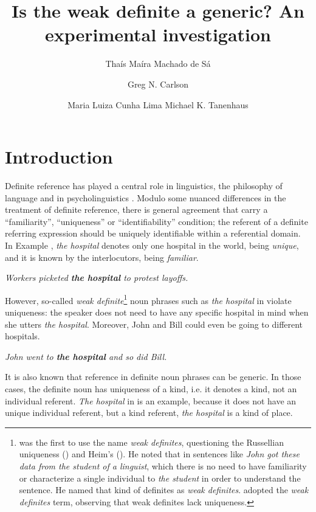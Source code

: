 \documentclass[output=paper,
modfonts
]{langscibook}
\title{Is the weak definite a generic? An experimental investigation}
\author{%
 Thaís Maíra Machado {de Sá}\affiliation{Universidade Federal de Minas Gerais}\and 
 Greg N. Carlson\affiliation{University of Rochester}\and 
 Maria Luiza {Cunha Lima}\affiliation{Universidade Federal de Minas Gerais}
 \lastand 
 Michael K. Tanenhaus\affiliation{University of Rochester \\ Nanjing Normal University}
}
\begin{document}
\maketitle

\section{Introduction}\label{sec:desaetal:1}
Definite reference has played a central role in linguistics, the philosophy of language and in psycholinguistics \citep{Russell1905, Strawson1950,Donnellan1966,ClarkMarshall1981,Heim1982,Aguilar-GuevaraZwarts2013}. Modulo some nuanced differences in the treatment of definite reference, there is general agreement that  carry a “familiarity”, “uniqueness” or “identifiability” condition; the referent of a definite referring expression should be uniquely identifiable within a referential domain. In Example , \textit{the hospital} denotes only one hospital in the world, being \textit{unique}, and it is known by the interlocutors, being \textit{familiar}.

\ea \label{ex:desaetal:1} 
\textit{Workers picketed \textbf{the hospital} to protest layoffs.}
\z

However, so-called \textit{weak definite}\footnote{\citet{Poesio1994} was the first to use the name \textit{weak definites}, questioning the Russellian uniqueness (\citeyear{Russell1905}) and Heim’s  (\citeyear{Heim1982}). He noted that in sentences like \textit{John got these data from the student of a linguist}, which there is no need to have familiarity or characterize a single individual to \textit{the student} in order  to understand the sentence. He named that kind of definites as \textit{weak definites}. \citet{CarlsonSussman2005} adopted the \textit{weak definites} term, observing that weak definites lack uniqueness.} noun phrases \citep{CarlsonSussman2005} such as \textit{the hospital} in  violate uniqueness: the speaker does not need to have any specific hospital in mind when she utters \textit{the hospital}. Moreover, John and Bill could even be going to different hospitals.

\ea \label{ex:desaetal:2}
\textit{John went to \textbf{the hospital} and so did Bill.}
\z

It is also known that reference in definite noun phrases can be generic. In those cases, the definite noun has uniqueness of a kind, i.e. it denotes a kind, not an individual referent. \textit{The hospital} in  is an example, because it does not have an unique individual referent, but a kind referent, \textit{the hospital} is a kind of place. 
\end{document}
